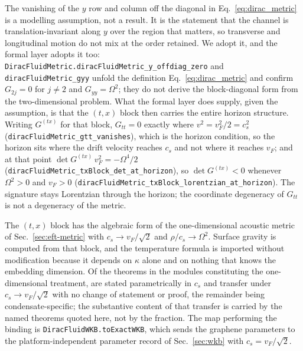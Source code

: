 \documentclass[aps,prd,reprint,nofootinbib,superscriptaddress]{revtex4-2}
\begin{document}
The vanishing of the $y$ row and column off the diagonal in
Eq.~\eqref{eq:dirac_metric} is a modelling assumption, not a result. It
is the statement that the channel is translation-invariant along $y$ over
the region that matters, so transverse and longitudinal motion do not mix
at the order retained. We adopt it, and the formal layer adopts it too:
\texttt{DiracFluidMetric.diracFluidMetric\_y\_offdiag\_zero} and
\texttt{diracFluidMetric\_gyy} unfold the definition
Eq.~\eqref{eq:dirac_metric} and confirm $G_{2j} = 0$ for $j \neq 2$ and
$G_{yy} = \Omega^2$; they do not derive the block-diagonal form from the
two-dimensional problem. What the formal layer does supply, given the
assumption, is that the $(t,x)$ block then carries the entire horizon
structure. Writing $G^{(tx)}$ for that block, $G_{tt} = 0$ exactly where
$v^2 = v_F^2/2 = c_s^2$
(\texttt{diracFluidMetric\_gtt\_vanishes}), which is the horizon
condition, so the horizon sits where the drift velocity reaches $c_s$ and
not where it reaches $v_F$; and at that point
$\det G^{(tx)}\, v_F^2 = -\Omega^4/2$
(\texttt{diracFluidMetric\_txBlock\_det\_at\_horizon}), so
$\det G^{(tx)} < 0$ whenever $\Omega^2 > 0$ and $v_F > 0$
(\texttt{diracFluidMetric\_txBlock\_lorentzian\_at\_horizon}). The
signature stays Lorentzian through the horizon; the coordinate degeneracy
of $G_{tt}$ is not a degeneracy of the metric.

The $(t,x)$ block has the algebraic form of the one-dimensional acoustic
metric of Sec.~\ref{sec:eft-metric} with $c_s \to v_F/\sqrt{2}$ and
$\rho/c_s \to \Omega^2$. Surface gravity is computed from that block, and
the temperature formula is imported without modification because it
depends on $\kappa$ alone and on nothing that knows the embedding
dimension. Of the \reusePopulation{} theorems in the modules constituting
the one-dimensional treatment, \reuseTransferred{} are stated
parametrically in $c_s$ and transfer under $c_s \to v_F/\sqrt{2}$ with no
change of statement or proof, the remainder being condensate-specific;
the substantive content of that transfer is carried by the named theorems
quoted here, not by the fraction. The map performing the binding is
\texttt{DiracFluidWKB.toExactWKB}, which sends the graphene parameters to
the platform-independent parameter record of Sec.~\ref{sec:wkb} with
$c_s = v_F/\sqrt{2}$.
\end{document}
